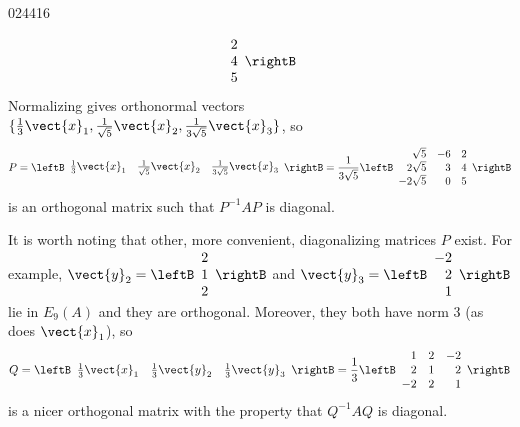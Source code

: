\begin{example}{}{024416}
\begin{solution}
\begin{equation*}
\begin{array}{r}
2 \\
4 \\
5
\end{array}\rightB
\end{equation*}
Normalizing gives orthonormal vectors $\{\frac{1}{3}\vect{x}_{1}, \frac{1}{\sqrt{5}}\vect{x}_{2}, \frac{1}{3\sqrt{5}}\vect{x}_{3}\}$, so
\begin{equation*}
P = \leftB \begin{array}{rrr}
\frac{1}{3}\vect{x}_{1} & \frac{1}{\sqrt{5}}\vect{x}_{2} & \frac{1}{3\sqrt{5}}\vect{x}_{3}
\end{array}\rightB = \frac{1}{3\sqrt{5}}\leftB \begin{array}{rrr}
\sqrt{5} & -6 & 2 \\
2\sqrt{5} & 3 & 4 \\
-2\sqrt{5} & 0 & 5
\end{array}\rightB
\end{equation*}
is an orthogonal matrix such that $P^{-1}AP$ is diagonal.


It is worth noting that other, more convenient, diagonalizing matrices $P$ exist. For example, $\vect{y}_{2} = \leftB \begin{array}{r}
2 \\
1 \\
2
\end{array}\rightB$ and $\vect{y}_{3} = \leftB \begin{array}{r}
-2 \\
2 \\
1
\end{array}\rightB$
 lie in $E_{9}(A)$ and they are orthogonal. Moreover, they both have norm $3$ (as does $\vect{x}_{1}$), so
\begin{equation*}
Q = \leftB \begin{array}{ccc}
\frac{1}{3}\vect{x}_{1} & \frac{1}{3}\vect{y}_{2} & \frac{1}{3}\vect{y}_{3}
\end{array}\rightB = \frac{1}{3}\leftB \begin{array}{rrr}
1 & 2 & -2 \\
2 & 1 & 2 \\
-2 & 2 & 1
\end{array}\rightB
\end{equation*}
is a nicer orthogonal matrix with the property that $Q^{-1}AQ$ is diagonal.
\end{solution}
\end{example}

\begin{wrapfigure}[12]{l}{5cm} 
\vspace*{-2em}
\centering

\end{wrapfigure}

